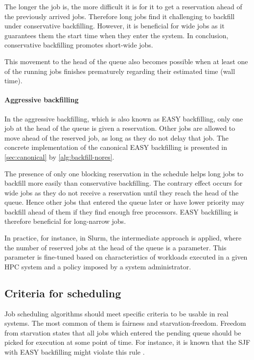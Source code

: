 \documentclass[thesis-en.tex]{subfiles}
\begin{document}
The longer the job is, the more difficult it is for it to get a reservation ahead of the previously arrived jobs. Therefore long jobs find it challenging to backfill under conservative backfilling. However, it is beneficial for wide jobs as it guarantees them the start time when they enter the system. In conclusion, conservative backfilling promotes short-wide jobs.

This movement to the head of the queue also becomes possible when at least one of the running jobs finishes prematurely regarding their estimated time (wall time).

\paragraph{Aggressive backfilling}
In the aggressive backfilling, which is also known as EASY backfilling, only one job at the head of the queue is given a reservation. Other jobs are allowed to move ahead of the reserved job, as long as they do not delay that job. The concrete implementation of the canonical EASY backfilling is presented in \autoref{sec:canonical} by \cref{alg:backfill-nores}.

The presence of only one blocking reservation in the schedule helps long jobs to backfill more easily than conservative backfilling. The contrary effect occurs for wide jobs as they do not receive a reservation until they reach the head of the queue. Hence other jobs that entered the queue later or have lower priority may backfill ahead of them if they find enough free processors. EASY backfilling is therefore beneficial for long-narrow jobs.

\bigskip

In practice, for instance, in Slurm, the intermediate approach is applied, where the number of reserved jobs at the head of the queue is a parameter. This parameter is fine-tuned based on characteristics of workloads executed in a given HPC system and a policy imposed by a system administrator.

\subsection{Criteria for scheduling}
Job scheduling algorithms should meet specific criteria to be usable in real systems. The most common of them is fairness and starvation-freedom. Freedom from starvation states that all jobs which entered the pending queue should be picked for execution at some point of time. For instance, it is known that the SJF with EASY backfilling might violate this rule \cite{srinivasan2002selective}.
\end{document}
